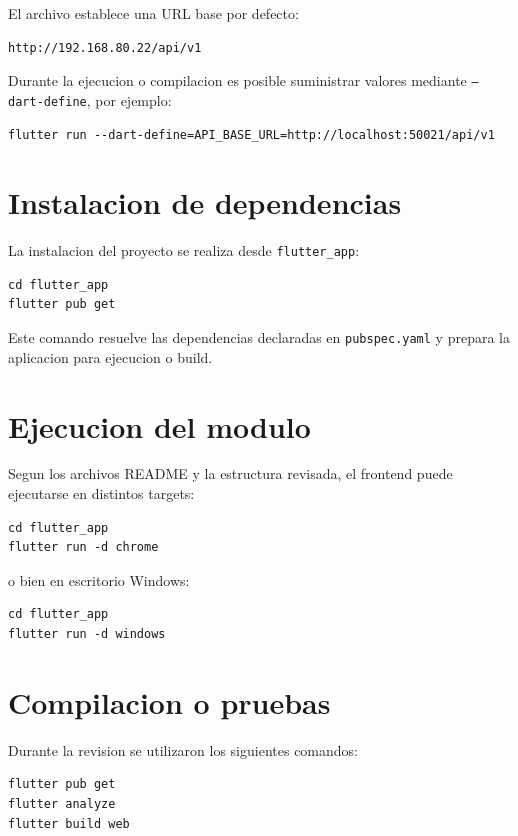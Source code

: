 \documentclass[conference]{IEEEtran}
\begin{document}
El archivo establece una URL base por defecto:

\begin{lstlisting}
http://192.168.80.22/api/v1
\end{lstlisting}

Durante la ejecucion o compilacion es posible suministrar valores mediante \texttt{--dart-define}, por ejemplo:

\begin{lstlisting}
flutter run --dart-define=API_BASE_URL=http://localhost:50021/api/v1
\end{lstlisting}

\section{Instalacion de dependencias}
La instalacion del proyecto se realiza desde \texttt{flutter\_app}:

\begin{lstlisting}
cd flutter_app
flutter pub get
\end{lstlisting}

Este comando resuelve las dependencias declaradas en \texttt{pubspec.yaml} y prepara la aplicacion para ejecucion o build.

\section{Ejecucion del modulo}
Segun los archivos README y la estructura revisada, el frontend puede ejecutarse en distintos targets:

\begin{lstlisting}
cd flutter_app
flutter run -d chrome
\end{lstlisting}

o bien en escritorio Windows:

\begin{lstlisting}
cd flutter_app
flutter run -d windows
\end{lstlisting}

\section{Compilacion o pruebas}
Durante la revision se utilizaron los siguientes comandos:

\begin{lstlisting}
flutter pub get
flutter analyze
flutter build web
\end{lstlisting}
\end{document}
